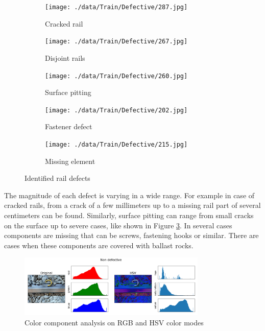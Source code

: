 \documentclass[10pt, final]{article}
\begin{document}
\begin{figure}[!ht]
	\centering
	\begin{subfigure}{0.3\textwidth}
		\centering
		\texttt{[image: ./data/Train/Defective/287.jpg]}
		\caption{Cracked rail}
		\label{fig:def_cracked}
	\end{subfigure}
	\begin{subfigure}{0.3\textwidth}
		\centering
		\texttt{[image: ./data/Train/Defective/267.jpg]}
		\caption{Disjoint rails}
		\label{fig:def_disjoint}
	\end{subfigure}
	\begin{subfigure}{0.3\textwidth}
		\centering
		\texttt{[image: ./data/Train/Defective/260.jpg]}
		\caption{Surface pitting}
		\label{fig:def_pitting}
	\end{subfigure}
	\begin{subfigure}{0.3\textwidth}
		\centering
		\texttt{[image: ./data/Train/Defective/202.jpg]}
		\caption{Fastener defect}
		\label{fig:def_nofix}
	\end{subfigure}
	\begin{subfigure}{0.3\textwidth}
		\centering
		\texttt{[image: ./data/Train/Defective/215.jpg]}
		\caption{Missing element}
		\label{fig:def_missing}
	\end{subfigure}
	\caption{Identified rail defects}
\end{figure}

The magnitude of each defect is varying in a wide range.
For example in case of cracked rails, from a crack of a few millimeters up to a missing rail part of several
centimeters can be found.
Similarly, surface pitting can range from small cracks on the surface up to severe cases, like shown in
Figure \ref{fig:def_pitting}.
In several cases components are missing that can be screws, fastening hooks or similar.
There are cases when these components are covered with ballast rocks.

\begin{figure}[!ht]
	\centering
	\includegraphics[width=0.8\textwidth]{./tex_graphs/comp_analysis_1.png}
	\caption{Color component analysis on RGB and HSV color modes}
	\label{fig:color_analysis}
\end{figure}
\end{document}
